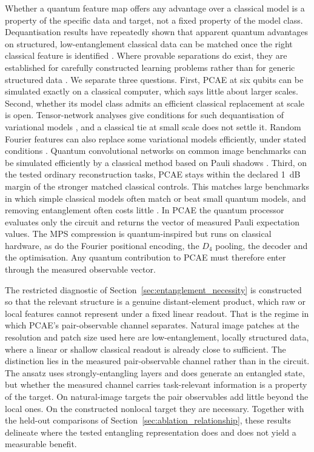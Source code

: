 \documentclass[pdflatex,sn-basic]{sn-jnl}
\begin{document}
Whether a quantum feature map offers any advantage over a classical model is a property of the specific data and target, not a fixed property of the model class. Dequantisation results have repeatedly shown that apparent quantum advantages on structured, low-entanglement classical data can be matched once the right classical feature is identified \citep{Huang2021PowerData, Tang2019}. Where provable separations do exist, they are established for carefully constructed learning problems rather than for generic structured data \citep{Gyurik2023}. We separate
three questions. First, PCAE at six qubits can be simulated exactly on a
classical computer, which says little about larger scales. Second, whether its
model class admits an efficient classical replacement at scale is open.
Tensor-network analyses give conditions for such dequantisation of variational
models \citep{Shin2024Dequant}, and a classical tie at small scale does not
settle it. Random Fourier features can also replace some variational
models efficiently, under stated conditions \citep{Sweke2025}. Quantum
convolutional networks on common image benchmarks can be simulated efficiently
by a classical method based on Pauli shadows \citep{Bermejo2026}. Third, on the tested ordinary reconstruction tasks, PCAE stays within the
declared 1~dB margin of the stronger matched classical controls. This matches large benchmarks in which simple classical models
often match or beat small quantum models, and removing entanglement often costs
little \citep{Bowles2024}. In PCAE the
quantum processor evaluates only the circuit and returns the vector of measured
Pauli expectation values. The MPS compression is quantum-inspired but runs on
classical hardware, as do the Fourier positional encoding, the $D_4$ pooling,
the decoder and the optimisation. Any quantum contribution to PCAE must
therefore enter through the measured observable vector.

The restricted diagnostic of Section~\ref{sec:entanglement_necessity} is constructed so that the relevant structure is a genuine distant-element product, which raw or local features cannot represent under a fixed linear readout. That is the regime in which PCAE's pair-observable channel separates. Natural image patches at the resolution and patch size used here are low-entanglement, locally structured data, where a linear or shallow classical readout is already close to sufficient. The distinction lies in the measured pair-observable channel rather than in the circuit. The ansatz uses strongly-entangling layers and does generate an entangled state, but whether the measured channel carries task-relevant information is a property of the target. On natural-image targets the pair observables add little beyond the local ones. On the constructed nonlocal target they are necessary. Together with the held-out comparisons of Section~\ref{sec:ablation_relationship}, these results delineate where the tested entangling representation does and does not yield a measurable benefit.
\end{document}
